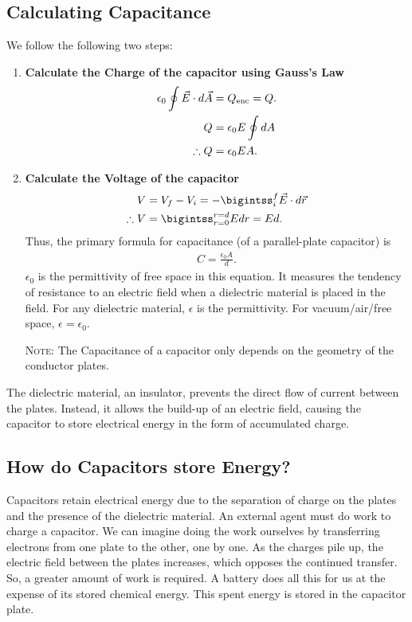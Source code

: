 \documentclass[12pt,b4paper]{article}
\begin{document}
\subsection{Calculating Capacitance}
We follow the following two steps:
\begin{enumerate}
    \item \textbf{Calculate the Charge of the capacitor using Gauss's Law}
    \begin{align}
        \epsilon_0\oint\vec{E}\cdot d\vec{A}&=Q_\text{enc}=Q.\notag\\
        Q&=\epsilon_0E\oint dA\notag\\
        \therefore Q&=\epsilon_0EA.
    \end{align}
    \item \textbf{Calculate the Voltage of the capacitor}
    \begin{align}
        V&=V_f-V_i=-\bigintss_i^f\vec{E}\cdot d\vec{r}\notag\\
        \therefore V&=\bigintss_{r=0}^{r=d}Edr=Ed.
    \end{align}
    Thus, the primary formula for capacitance (of a parallel-plate capacitor) is \begin{align}
        C=\frac{\epsilon_0A}{d}.
    \end{align}
    $\epsilon_0$ is the permittivity of free space in this equation. It measures the tendency of resistance to an electric field when a dielectric material is placed in the field. For any dielectric material, $\epsilon$ is the permittivity. For vacuum/air/free space, $\epsilon=\epsilon_0$.

    \textsc{Note}: The Capacitance of a capacitor only depends on the geometry of the conductor plates.
\end{enumerate}
The dielectric material, an insulator, prevents the direct flow of current between the plates. Instead, it allows the build-up of an electric field, causing the capacitor to store electrical energy in the form of accumulated charge.
\subsection{How do Capacitors store Energy?}
Capacitors retain electrical energy due to the separation of charge on the plates and the presence of the dielectric material. An external agent must do work to charge a capacitor. We can imagine doing the work ourselves by transferring electrons from one plate to the other, one by one. As the charges pile up, the electric field between the plates increases, which opposes the continued transfer. So, a greater amount of work is required. A battery does all this for us at the expense of its stored chemical energy. This spent energy is stored in the capacitor plate. 
\end{document}
